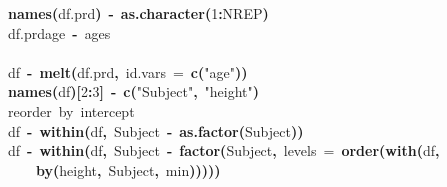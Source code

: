 \documentclass{article}
\makeatletter
\newcommand{\hlnumber}[1]{\textcolor[rgb]{0,0,0}{#1}}%
\newcommand{\hlfunctioncall}[1]{\textcolor[rgb]{.5,0,.33}{\textbf{#1}}}%
\newcommand{\hlstring}[1]{\textcolor[rgb]{.6,.6,1}{#1}}%
\newcommand{\hlkeyword}[1]{\textbf{#1}}%
\newcommand{\hlargument}[1]{\textcolor[rgb]{.69,.25,.02}{#1}}%
\newcommand{\hlcomment}[1]{\textcolor[rgb]{.18,.6,.34}{#1}}%
\newcommand{\hlassignement}[1]{\textbf{#1}}%
\newcommand{\hlsymbol}[1]{#1}%
\newcommand{\hlstd}[1]{\textcolor[rgb]{0,0,0}{#1}}%
\newenvironment{kframe}{%
 \def\FrameCommand##1{\hskip\@totalleftmargin \hskip-\fboxsep
 \colorbox{shadecolor}{##1}\hskip-\fboxsep
     \hskip-\linewidth \hskip-\@totalleftmargin \hskip\columnwidth}%
 \MakeFramed {\advance\hsize-\width
   \@totalleftmargin\z@ \linewidth\hsize
   \@setminipage}}%
 {\par\unskip\endMakeFramed}
\newenvironment{knitrout}{}{} %
\makeatother
\begin{document}
\begin{knitrout}
{\begin{kframe}
\begin{flushleft}
\hlstd{}\hlfunctioncall{names}\hlkeyword{(}\hlsymbol{df.prd}\hlkeyword{)}{\ }\hlassignement{\usebox{\hlnormalsizeboxlessthan}-}{\ }\hlfunctioncall{as.character}\hlkeyword{(}\hlnumber{1}\hlkeyword{:}\hlsymbol{NREP}\hlkeyword{)}\hspace*{\fill}\\
\hlstd{}\hlsymbol{df.prd}\hlkeyword{\usebox{\hlnormalsizeboxdollar}}\hlsymbol{age}{\ }\hlassignement{\usebox{\hlnormalsizeboxlessthan}-}{\ }\hlsymbol{ages}\hspace*{\fill}\\
\hlstd{}\hspace*{\fill}\\
\hlstd{}\hlsymbol{df}{\ }\hlassignement{\usebox{\hlnormalsizeboxlessthan}-}{\ }\hlfunctioncall{melt}\hlkeyword{(}\hlsymbol{df.prd}\hlkeyword{,}{\ }\hlargument{id.vars}{\ }\hlargument{=}{\ }\hlfunctioncall{c}\hlkeyword{(}\hlstring{"{}age"{}}\hlkeyword{)}\hlkeyword{)}\hspace*{\fill}\\
\hlstd{}\hlfunctioncall{names}\hlkeyword{(}\hlsymbol{df}\hlkeyword{)}\hlkeyword{[}\hlnumber{2}\hlkeyword{:}\hlnumber{3}\hlkeyword{]}{\ }\hlassignement{\usebox{\hlnormalsizeboxlessthan}-}{\ }\hlfunctioncall{c}\hlkeyword{(}\hlstring{"{}Subject"{}}\hlkeyword{,}{\ }\hlstring{"{}height"{}}\hlkeyword{)}\hspace*{\fill}\\
\hlstd{}\hlcomment{\usebox{\hlnormalsizeboxhash}reorder{\ }by{\ }intercept}\hspace*{\fill}\\
\hlstd{}\hlsymbol{df}{\ }\hlassignement{\usebox{\hlnormalsizeboxlessthan}-}{\ }\hlfunctioncall{within}\hlkeyword{(}\hlsymbol{df}\hlkeyword{,}{\ }\hlsymbol{Subject}{\ }\hlassignement{\usebox{\hlnormalsizeboxlessthan}-}{\ }\hlfunctioncall{as.factor}\hlkeyword{(}\hlsymbol{Subject}\hlkeyword{)}\hlkeyword{)}\hspace*{\fill}\\
\hlstd{}\hlsymbol{df}{\ }\hlassignement{\usebox{\hlnormalsizeboxlessthan}-}{\ }\hlfunctioncall{within}\hlkeyword{(}\hlsymbol{df}\hlkeyword{,}{\ }\hlsymbol{Subject}{\ }\hlassignement{\usebox{\hlnormalsizeboxlessthan}-}{\ }\hlfunctioncall{factor}\hlkeyword{(}\hlsymbol{Subject}\hlkeyword{,}{\ }\hlargument{levels}{\ }\hlargument{=}{\ }\hlfunctioncall{order}\hlkeyword{(}\hlfunctioncall{with}\hlkeyword{(}\hlsymbol{df}\hlkeyword{,}\hspace*{\fill}\\
\hlstd{}{\ }{\ }{\ }{\ }\hlfunctioncall{by}\hlkeyword{(}\hlsymbol{height}\hlkeyword{,}{\ }\hlsymbol{Subject}\hlkeyword{,}{\ }\hlsymbol{min}\hlkeyword{)}\hlkeyword{)}\hlkeyword{)}\hlkeyword{)}\hlkeyword{)}\hspace*{\fill}\\

\end{flushleft}
\end{kframe}}
\end{knitrout}
\end{document}
